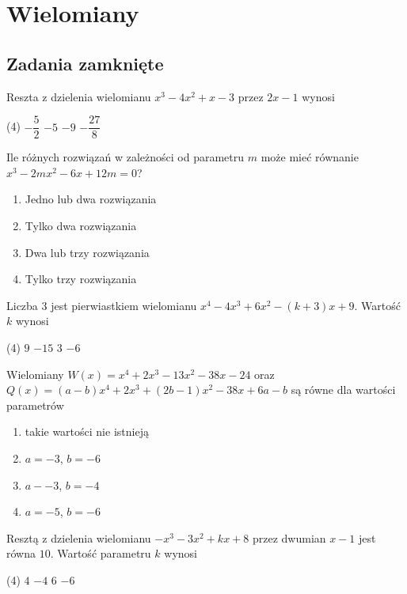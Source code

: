 \setcounter{parc}{0}
\addtocounter{chapc}{1}

\chapter{Wielomiany}

\section{Zadania zamknięte}

\zadanie Reszta z dzielenia wielomianu $x^3 - 4x^2 + x -3$ przez $2x - 1$ wynosi
\begin{tasks}(4)
	\task $-\dfrac{5}{2}$
	\task $-5$
	\task $-9$
	\task $-\dfrac{27}{8}$ %
\end{tasks}

\zadanie Ile różnych rozwiązań w zależności od parametru $m$ może mieć równanie $x^3 - 2mx^2 - 6x + 12m = 0$?
\begin{enumerate}[label=\alph*)]
	\item Jedno lub dwa rozwiązania
	\item Tylko dwa rozwiązania
	\item Dwa lub trzy rozwiązania %
	\item Tylko trzy rozwiązania
\end{enumerate}

\zadanie Liczba $3$ jest pierwiastkiem wielomianu ${x^4 - 4x^3 + 6x^2 - (k + 3)x + 9}$. Wartość $k$ wynosi
\begin{tasks}(4)
	\task $9$ %
	\task $-15$
	\task $3$
	\task $-6$
\end{tasks}

\newpage

\zadanie Wielomiany $W(x) = x^4 + 2x^3 - 13x^2 - 38x - 24$ oraz\\ ${Q(x) = (a - b)x^4 + 2x^3 +(2b - 1)x^2 -38x +6a - b}$ są równe dla wartości parametrów
\begin{enumerate}[label=\alph*)]
	\item takie wartości nie istnieją
	\item $a = -3$, $b = -6$
	\item $a - -3$, $b = -4$
	\item $a = -5$, $b = -6$ %
\end{enumerate}

\zadanie Resztą z dzielenia wielomianu $-x^3 - 3x^2 + kx +8$ przez dwumian $x - 1$ jest równa $10$. Wartość parametru $k$ wynosi
\begin{tasks}(4)
	\task $4$
	\task $-4$
	\task $6$ %
	\task $-6$
\end{tasks}

